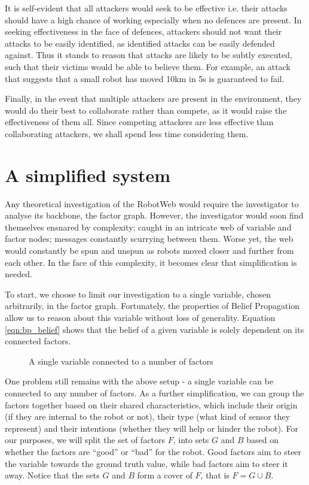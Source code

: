 It is self-evident that all attackers would seek to be effective i.e. their attacks should have a high chance of working especially when no defences are present. In seeking effectiveness in the face of defences, attackers should not want their attacks to be easily identified, as identified attacks can be easily defended against. Thus it stands to reason that attacks are likely to be subtly executed, such that their victims would be able to believe them. For example, an attack that suggests that a small robot has moved 10km in 5s is guaranteed to fail.

Finally, in the event that multiple attackers are present in the environment, they would do their best to collaborate rather than compete, as it would raise the effectiveness of them all. Since competing attackers are less effective than collaborating attackers, we shall spend less time considering them.

\section{A simplified system}
Any theoretical investigation of the RobotWeb would require the investigator to analyse its backbone, the factor graph. However, the investigator would soon find themselves ensnared by complexity; caught in an intricate web of variable and factor nodes; messages constantly scurrying between them. Worse yet, the web would constantly be spun and unspun as robots moved closer and further from each other. In the face of this complexity, it becomes clear that simplification is needed.

To start, we choose to limit our investigation to a single variable, chosen arbitrarily, in the factor graph. Fortunately, the properties of Belief Propagation allow us to reason about this variable without loss of generality. Equation \ref{eqn:bp_belief} shows that the belief of a given variable is solely dependent on its connected factors. 

\begin{figure}[!h]
	\centering
	

	\caption[Single Variable in a Factor Graph]{A single variable connected to a number of factors}
\end{figure}

One problem still remains with the above setup - a single variable can be connected to any number of factors. As a further simplification, we can group the factors together based on their shared characteristics, which include their origin (if they are internal to the robot or not), their type (what kind of sensor they represent) and their intentions (whether they will help or hinder the robot). For our purposes, we will split the set of factors $F$, into sets $G$ and $B$ based on whether the factors are ``good'' or ``bad'' for the robot. Good factors aim to steer the variable towards the ground truth value, while bad factors aim to steer it away. Notice that the sets $G$ and $B$ form a cover of $F$, that is $F = G \cup B$.

